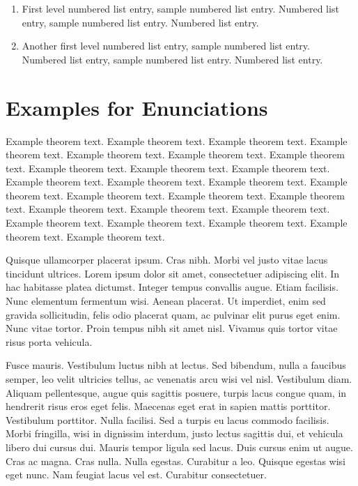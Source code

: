 \documentclass[ASNA,twocolumn]{USG} %
\begin{document}
{\begin{enumerate}
\item First level numbered list entry, sample numbered list entry. Numbered list entry, sample numbered list entry. Numbered list entry.

\item Another first level numbered list entry, sample numbered list entry. Numbered list entry, sample numbered list entry. Numbered list entry.
\end{enumerate}


\section{Examples for Enunciations}\label{sec4}

\begin{theorem}\label{thm1}
Example theorem text. Example theorem text. Example theorem text. Example theorem text. Example theorem text. Example theorem text. Example theorem text. Example theorem text. Example theorem text. Example theorem text. Example theorem text. Example theorem text. Example theorem text. Example theorem text. Example theorem text. Example theorem text. Example theorem text. Example theorem text. Example theorem text. Example theorem text. Example theorem text. Example theorem text. Example theorem text. Example theorem text. Example theorem text.
\end{theorem}

Quisque ullamcorper placerat ipsum. Cras nibh. Morbi vel justo vitae lacus tincidunt ultrices. Lorem ipsum dolor sit
amet, consectetuer adipiscing elit. In hac habitasse platea dictumst. Integer tempus convallis augue. Etiam facilisis.
Nunc elementum fermentum wisi. Aenean placerat. Ut imperdiet, enim sed gravida sollicitudin, felis odio placerat
quam, ac pulvinar elit purus eget enim. Nunc vitae tortor. Proin tempus nibh sit amet nisl. Vivamus quis tortor
vitae risus porta vehicula.

Fusce mauris. Vestibulum luctus nibh at lectus. Sed bibendum, nulla a faucibus semper, leo velit ultricies tellus, ac
venenatis arcu wisi vel nisl. Vestibulum diam. Aliquam pellentesque, augue quis sagittis posuere, turpis lacus congue
quam, in hendrerit risus eros eget felis. Maecenas eget erat in sapien mattis porttitor. Vestibulum porttitor. Nulla
facilisi. Sed a turpis eu lacus commodo facilisis. Morbi fringilla, wisi in dignissim interdum, justo lectus sagittis dui, et
vehicula libero dui cursus dui. Mauris tempor ligula sed lacus. Duis cursus enim ut augue. Cras ac magna. Cras nulla.
Nulla egestas. Curabitur a leo. Quisque egestas wisi eget nunc. Nam feugiat lacus vel est. Curabitur consectetuer.

}
\end{document}
